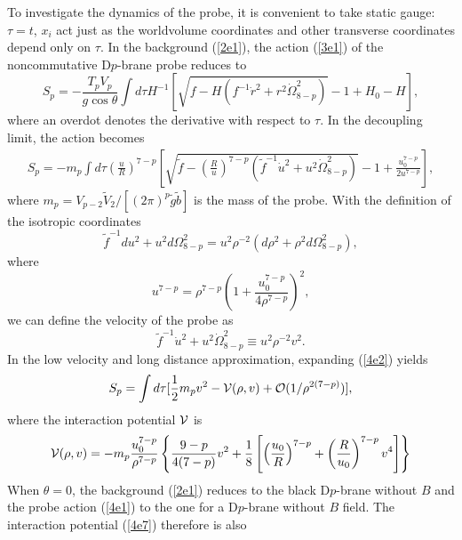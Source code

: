 \documentclass[a4paper,12pt]{article}
\begin{document}
To investigate the dynamics of the probe, it is convenient to take static
gauge: $\tau =t$, $x_i$ act just as the worldvolume coordinates and other
transverse coordinates depend only on $\tau$. In the background (\ref{2e1}),
the action (\ref{3e1}) of the noncommutative D$p$-brane probe reduces to
\begin{equation}
\label{4e1}
S_p=-\frac{T_pV_p}{g\cos\theta}
  \int d\tau H^{-1}[\sqrt{f-H(f^{-1}\dot{r}^2
  + r^2 \dot{\Omega}_{8-p}^2)}-1 + H_0 - H],
\end{equation}
where an overdot denotes the derivative with respect to $\tau$. In the
decoupling limit, the action becomes
\begin{eqnarray}
\label{4e2}
S_p =-m_p\int d\tau \left(\frac{u}{R}\right)^{7-p}\left [
 \sqrt{\tilde{f} -\left(\frac{R}{u}\right)^{7-p}\left(\tilde{f}^{-1}
 \dot{u}^2 +u^2 \dot{\Omega}^2_{8-p}\right)}-1
 +\frac{u_0^{7-p}}{2u^{7-p}}\right],
\end{eqnarray}
where $m_p=V_{p-2}\tilde{V}_2/[(2\pi)^p\tilde{g}\tilde{b}]$ is the mass of
the probe. With the definition of the isotropic coordinates
\begin{equation}
\tilde{f}^{-1} du^2 +u^2 d\Omega_{8-p}^2 = u^2 {\rho}^{-2}
     (d{\rho}^2 +{\rho}^2 d\Omega^2_{8-p}),
\end{equation}
where
\begin{equation}
u^{7-p}=\rho^{7-p}\left ( 1+\frac{u_0^{7-p}}{4\rho^{7-p}} \right)^2,
\end{equation}
we can define the velocity of the probe as
\begin{equation}
\tilde{f}^{-1}\dot{u}^2 + u^2 \dot{\Omega}_{8-p}^2
 \equiv u^2{\rho}^{-2}v^2.
\end{equation}
In the low velocity and long distance approximation, expanding (\ref{4e2})
yields
\begin{equation}
S_p =\int d\tau [\frac{1}{2}m_p v^2 -{\cal V}(\rho,v)
 +{\cal O}(1/\rho^{2(7-p)})],
\end{equation}
where the interaction potential ${\cal V}$ is
\begin{equation}
\label{4e7}
{\cal V}(\rho, v)=-m_p\frac{u_0^{7-p}}{\rho^{7-p}}
  \left \{ \frac{9-p}{4(7-p)} v^2
 +\frac{1}{8}\left [\left(\frac{u_0}{R}\right)^{7-p} +
  \left(\frac{R}{u_0}\right)^{7-p}v^4 \right] \right\}
\end{equation}
When $\theta =0$, the background (\ref{2e1}) reduces to the black D$p$-brane
without $B$ and the probe action (\ref{4e1}) to the one for a D$p$-brane
without $B$ field. The interaction potential (\ref{4e7}) therefore is also
\end{document}
